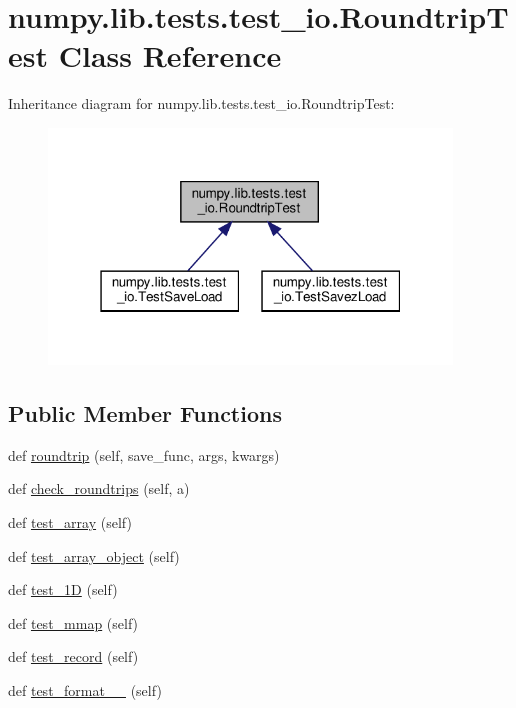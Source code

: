 \hypertarget{classnumpy_1_1lib_1_1tests_1_1test__io_1_1RoundtripTest}{}\section{numpy.\+lib.\+tests.\+test\+\_\+io.\+Roundtrip\+Test Class Reference}
\label{classnumpy_1_1lib_1_1tests_1_1test__io_1_1RoundtripTest}


Inheritance diagram for numpy.\+lib.\+tests.\+test\+\_\+io.\+Roundtrip\+Test\+:
\nopagebreak
\begin{figure}[H]
\begin{center}
\leavevmode
\includegraphics[width=304pt]{classnumpy_1_1lib_1_1tests_1_1test__io_1_1RoundtripTest__inherit__graph}
\end{center}
\end{figure}
\subsection*{Public Member Functions}
\begin{DoxyCompactItemize}
\item 
def \hyperlink{classnumpy_1_1lib_1_1tests_1_1test__io_1_1RoundtripTest_ae1c15bc5691008062e774b5f4cb5c7bc}{roundtrip} (self, save\+\_\+func, args, kwargs)
\item 
def \hyperlink{classnumpy_1_1lib_1_1tests_1_1test__io_1_1RoundtripTest_ab4982730f89d39e519836fbcd7de468f}{check\+\_\+roundtrips} (self, a)
\item 
def \hyperlink{classnumpy_1_1lib_1_1tests_1_1test__io_1_1RoundtripTest_ae35a7e862558852e62642b5c2f85c4a7}{test\+\_\+array} (self)
\item 
def \hyperlink{classnumpy_1_1lib_1_1tests_1_1test__io_1_1RoundtripTest_a8d0938c6226145abadf6a0057cf28313}{test\+\_\+array\+\_\+object} (self)
\item 
def \hyperlink{classnumpy_1_1lib_1_1tests_1_1test__io_1_1RoundtripTest_a0ccea7dbe8ae5a852d4729318c29752c}{test\+\_\+1D} (self)
\item 
def \hyperlink{classnumpy_1_1lib_1_1tests_1_1test__io_1_1RoundtripTest_a3c1ff490ddee46eef9841e1658ec087a}{test\+\_\+mmap} (self)
\item 
def \hyperlink{classnumpy_1_1lib_1_1tests_1_1test__io_1_1RoundtripTest_a4cb4883c5f8595eb023dc180391c072f}{test\+\_\+record} (self)
\item 
def \hyperlink{classnumpy_1_1lib_1_1tests_1_1test__io_1_1RoundtripTest_aafe91e1edb2a031311aea7f1429dfc1f}{test\+\_\+format\+\_\+\_} (self)
\end{DoxyCompactItemize}
